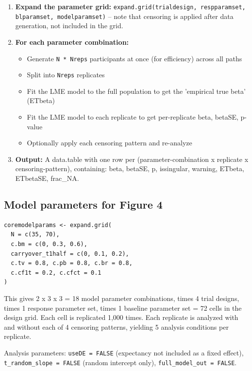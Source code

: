 \documentclass[11pt]{article}
\begin{document}
\begin{enumerate}
  \item \textbf{Expand the parameter grid:}
    \texttt{expand.grid(trialdesign, respparamset, blparamset,
    modelparamset)} -- note that censoring is applied after
    data generation, not included in the grid.
  \item \textbf{For each parameter combination:}
    \begin{itemize}
      \item Generate \texttt{N * Nreps} participants at once (for efficiency)
        across all paths
      \item Split into \texttt{Nreps} replicates
      \item Fit the LME model to the full population to get the
        'empirical true beta' (ETbeta)
      \item Fit the LME model to each replicate to get per-replicate
        beta, betaSE, p-value
      \item Optionally apply each censoring pattern and re-analyze
    \end{itemize}
  \item \textbf{Output:} A data.table with one row per
    (parameter-combination x replicate x censoring-pattern),
    containing: beta, betaSE, p, issingular, warning, ETbeta,
    ETbetaSE, frac\_NA.
\end{enumerate}

\subsection{Model parameters for Figure 4}

\begin{lstlisting}
coremodelparams <- expand.grid(
  N = c(35, 70),
  c.bm = c(0, 0.3, 0.6),
  carryover_t1half = c(0, 0.1, 0.2),
  c.tv = 0.8, c.pb = 0.8, c.br = 0.8,
  c.cf1t = 0.2, c.cfct = 0.1
)
\end{lstlisting}

This gives 2 x 3 x 3 = 18 model parameter combinations, times
4 trial designs, times 1 response parameter set, times 1
baseline parameter set = 72 cells in the design grid. Each cell
is replicated 1,000 times. Each replicate is analyzed with and
without each of 4 censoring patterns, yielding 5 analysis
conditions per replicate.

Analysis parameters: \texttt{useDE = FALSE} (expectancy not included
as a fixed effect), \texttt{t\_random\_slope = FALSE} (random intercept
only), \texttt{full\_model\_out = FALSE}.
\end{document}
